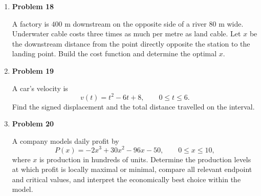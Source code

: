 \begin{enumerate}
\item \textbf{Problem 18}\par
A factory is \(400\) m downstream on the opposite side of a river \(80\) m wide. Underwater cable costs three times as much per metre as land cable. Let \(x\) be the downstream distance from the point directly opposite the station to the landing point. Build the cost function and determine the optimal \(x\).

\item \textbf{Problem 19}\par
A car's velocity is
\[
v(t)=t^2-6t+8,\qquad 0\le t\le6.
\]
Find the signed displacement and the total distance travelled on the interval.

\item \textbf{Problem 20}\par
A company models daily profit by
\[
P(x)=-2x^3+30x^2-96x-50,
\qquad 0\le x\le10,
\]
where \(x\) is production in hundreds of units. Determine the production levels at which profit is locally maximal or minimal, compare all relevant endpoint and critical values, and interpret the economically best choice within the model.
\end{enumerate}
